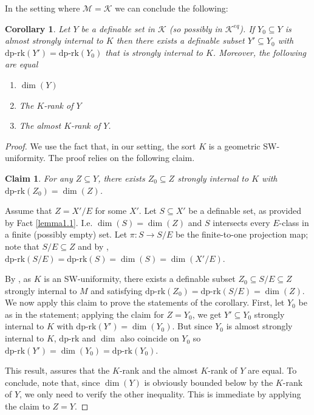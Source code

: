 \documentclass[11pt]{amsart}
\newtheorem{claim}{Claim}[theorem]
\newtheorem{corollary}[theorem]{Corollary}
\theoremstyle{definition}
\newcommand{\CK}{{\mathcal K}}
\newcommand{\CM}{{\mathcal M}}
\newcommand{\0}{\emptyset}
\def\dpr{\mathrm{dp\text{-}rk}}
\def\sub{\subseteq}
\newenvironment{claimproof}[1][\proofname]
  {%
    \proof[#1]%
      \renewcommand*\qedsymbol{$\square$ (claim)}%
  }
  {%
    \endproof%
  }
\begin{document}
In the setting where $\CM=\CK$ we can conclude the following:
\begin{corollary}\label{C:every thing is strongly internal to K}
Let $Y$ be a definable set in $\CK$ (so possibly in $\CK^{eq}$). If $Y_0\sub Y$ is almost strongly internal to $K$ then there exists a definable subset $Y'\subseteq Y_0$ with $\dpr(Y')=\dpr(Y_0)$ that is strongly internal to $K$. Moreover, the following are equal
\begin{enumerate}
    \item $\dim(Y)$
    \item The $K$-rank of $Y$
    \item The almost $K$-rank of $Y$.
\end{enumerate}
\end{corollary}
\begin{proof}
We use the fact that, in our setting,  the sort $K$ is a geometric SW-uniformity. The proof relies on the following claim.
\begin{claim}
    For any $Z\subseteq Y$, there exists $Z_0\subseteq Z$ strongly internal to $K$ with $\dpr(Z_0)=\dim(Z)$.
\end{claim}
\begin{claimproof}
    Assume that $Z=X'/E$ for some $X'$. Let $S\subseteq X'$ be a definable set, as provided by Fact \ref{lemma1.1}.  I.e. $\dim(S)=\dim(Z)$ and $S$ intersects every $E$-class in a finite (possibly empty) set. Let $\pi:S\to S/E$ be the finite-to-one projection map; note that $S/E\subseteq Z$ and by \cite[Theorem 0.3(1)]{Simdp}, $\dpr(S/E)=\dpr(S)=\dim(S)=\dim(X'/E)$. 

By \cite[Lemma 2.6(1)]{HaHaPeGps}, as $K$ is an SW-uniformity,  there exists a definable subset $Z_0\subseteq S/E\subseteq Z$ strongly internal to $M$ and satisfying  $\dpr(Z_0)=\dpr(S/E)=\dim(Z)$.
\end{claimproof}
We now apply this claim to prove the statements of the corollary.
First, let $Y_0$ be as in the statement; applying the claim for $Z=Y_0$, we get $Y'\subseteq Y_0$ strongly internal to $K$ with $\dpr(Y')=\dim(Y_0)$. But since $Y_0$ is almost strongly internal to $K$, $\dpr$ and $\dim$ also coincide on $Y_0$ so $\dpr(Y')=\dim(Y_0)=\dpr(Y_0)$.

This result, assures that the $K$-rank and the almost $K$-rank of $Y$ are equal. To conclude, note that, since $\dim(Y)$ is obviously bounded below by the $K$-rank of $Y$, we only need to verify the other inequality. This is immediate by applying the claim to $Z=Y$. 
\end{proof}
\end{document}
